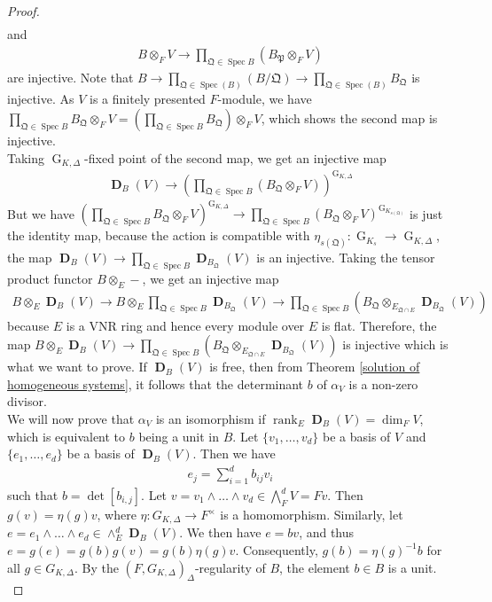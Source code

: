 \documentclass{amsart}
\DeclareMathOperator{\spec}{Spec}
\DeclareMathOperator{\rank}{rank}
\DeclareMathOperator{\G}{G}
\DeclareMathOperator{\bD}{\textbf{D}}
\begin{document}
\begin{proof}
\begin{align*}
    \end{align*}
    and 
    \begin{align*}
        B\otimes_F V\to \prod\limits_{\mathfrak{Q}\in\spec B}(B_{\mathfrak{P}}\otimes_F V)
    \end{align*}
    are injective. Note that $B\to\prod\limits_{\mathfrak{Q}\in\spec(B)}(B/\mathfrak{Q})\to\prod\limits_{\mathfrak{Q}\in\spec(B)}B_{\mathfrak{Q}}$ is injective. As $V$ is a finitely presented $F$-module, we have $\prod\limits_{\mathfrak{Q}\in\spec B}B_{\mathfrak{Q}}\otimes_F V=\left(\prod\limits_{\mathfrak{Q}\in\spec B}B_{\mathfrak{Q}}\right)\otimes_F V$, which shows the second map is injective.\\

    Taking $\G_{K,\Delta}$-fixed point of the second map, we get an injective map
    \begin{align*}
        \bD_B(V)\to \left(\prod\limits_{\mathfrak{Q}\in\spec B}(B_{\mathfrak{Q}}\otimes_F V)\right)^{\G_{K,\Delta}}
    \end{align*}
   But we have $\left(\prod\limits_{\mathfrak{Q}\in\spec B}B_{\mathfrak{Q}}\otimes_F V\right)^{\G_{K,\Delta}}\to \prod\limits_{\mathfrak{Q}\in\spec B}(B_{\mathfrak{Q}}\otimes_F V)^{\G_{K_{s(\mathfrak{Q})}}}$ is just the identity map, because the action is compatible with $\eta_{s(\mathfrak{Q})}:\G_{K_s}\to\G_{K,\Delta}$, the map $\bD_B(V)\to\prod\limits_{\mathfrak{Q}\in\spec{B}}\bD_{B_{\mathfrak{Q}}}(V)$ is an injective. Taking the tensor product functor $B\otimes_E-$, we get an injective map
   \begin{align*}
       B\otimes_E\bD_B(V)\to B\otimes_E\prod\limits_{\mathfrak{Q}\in\spec B}\bD_{B_{\mathfrak{Q}}}(V)\to \prod\limits_{\mathfrak{Q}\in\spec B}(B_{\mathfrak{Q}}\otimes_{E_{\mathfrak{Q}\cap E}}\bD_{B_{\mathfrak{Q}}}(V))
   \end{align*}
    because $E$ is a VNR ring and hence every module over $E$ is flat. Therefore, the map $B\otimes_E\bD_B(V)\to \prod\limits_{\mathfrak{Q}\in\spec B}\left(B_{\mathfrak{Q}}\otimes_{E_{\mathfrak{Q}\cap E}}\bD_{B_{\mathfrak{Q}}}(V)\right)$ is injective which is what we want to prove. If $\bD_B(V)$ is free, then from Theorem \ref{solution of homogeneous systems}, it follows that the determinant $b$ of $\alpha_V$ is a non-zero divisor.\\

    We will now prove that $\alpha_V$ is an isomorphism if $\rank_E\bD_B(V)=\dim_F V$, which is equivalent to $b$ being a unit in $B$. Let $\{v_1,\dots,v_d\}$ be a basis of $V$ and $\{e_1,\dots,e_d\}$ be a basis of $\bD_B(V)$. Then we have
    \begin{align*}
        e_j=\sum\limits_{i=1}^db_{ij}v_i
    \end{align*}
    such that $b=\det[b_{i,j}]$. Let $v=v_1\wedge\dots\wedge v_d\in \bigwedge^d_FV=Fv$. Then $g(v)=\eta(g)v$, where $\eta:G_{K,\Delta}\to F^\times$ is a homomorphism. Similarly, let $e=e_1\wedge\dots\wedge e_d\in\wedge^d_E\bD_B(V)$. We then have $e=bv$, and thus $e=g(e)=g(b)g(v)=g(b)\eta(g)v$. Consequently, $g(b)=\eta(g)^{-1}b$ for all $g\in G_{K,\Delta}$. By the $(F,G_{K,\Delta})_\Delta$-regularity of $B$, the element $b\in B$ is a unit.\\


\end{proof}
\end{document}
